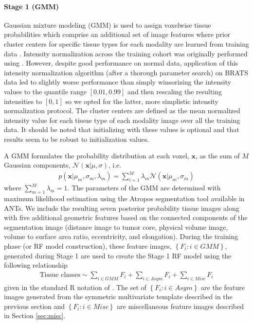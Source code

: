 \documentclass[preprint,authoryear,review,12pt]{elsarticle}
\begin{document}
\paragraph{Stage 1 (GMM)}
Gaussian mixture modeling (GMM) is used to assign voxelwise
tissue probabilities which comprise an additional set of image features 
where 
prior cluster centers for specific tissue types for each
modality are learned from training data \citep{reynolds2009}.  
Intensity normalization
across the training cohort was originally performed using 
\cite{nyul2000}.  However, despite good performance on normal
data, application of this intensity normalization algorithm 
(after a thorough parameter search) on BRATS data led to slightly 
worse performance than simply winsorizing the intensity values to the quantile
range $[0.01, 0.99]$ and then rescaling the resulting intensities to 
$[0,1]$ so we opted for the latter, more simplistic intensity
normalization protocol.  The cluster centers are defined as the mean
normalized intensity value for each tissue type of each modality 
image over all the training data.  It should be noted that 
initializing with these values is optional and that results
seem to be robust to initialization values.

A GMM formulates the 
probability distribution at each voxel, $\mathbf{x}$, as the
sum of $M$ Gaussian components, $\mathcal{N}(\mathbf{x}|\mu,\sigma)$, i.e.
\begin{align}
p\left(\mathbf{x}|\mu_m,\sigma_m,\lambda_m\right) = \sum_{i=1}^M \lambda_m \mathcal{N}(\mathbf{x}|\mu_m,\sigma_m)
\end{align}
where $\sum_{m=1}^M \lambda_m = 1$.  The parameters of the GMM 
are determined with maximum likelihood estimation using the 
Atropos segmentation tool \citep{avants2011} available in ANTs.  
We include the resulting seven posterior probability tissue images 
along with five additional geometric features based on the connected 
components of the segmentation image (distance image to tumor core,
physical volume image, volume to surface area ratio, eccentricity,
and elongation).
During the training phase (or RF model construction),
these feature images, $\left\{F_i: i \in GMM\right\}$, generated during Stage 1 are used to create
the Stage 1 RF model using the following relationship
\begin{align}
\label{eq:gmm}
\mathrm{Tissue}\,\,\mathrm{classes} \sim \sum_{i \in GMM} F_i + \sum_{i \in Asym} F_i + \sum_{i \in Misc} F_i
\end{align}
given in the standard R notation of \cite{wilkinson1973}.  The
set of $\left\{F_i: i \in Asym\right\}$ are the feature images 
generated from the symmetric multivariate template 
described in the previous section and $\left\{F_i: i \in Misc\right\}$
are miscellaneous  feature images described in Section \ref{sec:misc}.
\end{document}
